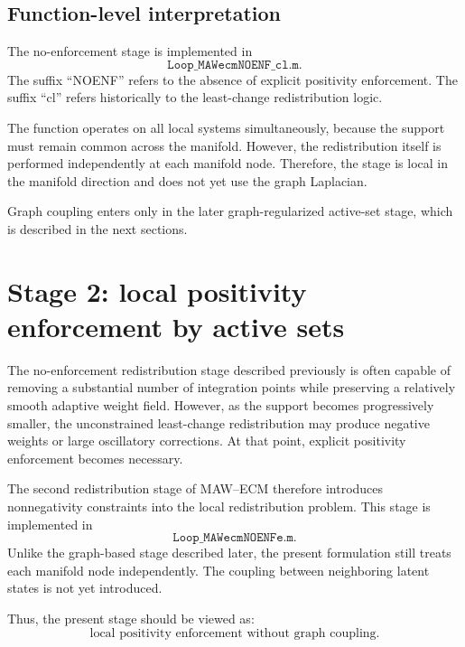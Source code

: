 \documentclass[11pt,a4paper]{article}
\begin{document}
\subsection{Function-level interpretation}

The no-enforcement stage is implemented in
\[
        \texttt{Loop\_MAWecmNOENF\_cl.m}.
\]
The suffix ``NOENF'' refers to the absence of explicit positivity enforcement.
The suffix ``cl'' refers historically to the least-change redistribution logic.

The function operates on all local systems simultaneously, because the support
must remain common across the manifold. However, the redistribution itself is
performed independently at each manifold node. Therefore, the stage is local in
the manifold direction and does not yet use the graph Laplacian.

Graph coupling enters only in the later graph-regularized active-set stage,
which is described in the next sections.


\section{Stage 2: local positivity enforcement by active sets}
\label{sec:local_active_set_stage}

The no-enforcement redistribution stage described previously is often capable
of removing a substantial number of integration points while preserving a
relatively smooth adaptive weight field. However, as the support becomes
progressively smaller, the unconstrained least-change redistribution may produce
negative weights or large oscillatory corrections. At that point, explicit
positivity enforcement becomes necessary.

The second redistribution stage of MAW--ECM therefore introduces nonnegativity
constraints into the local redistribution problem. This stage is implemented in
\[
        \texttt{Loop\_MAWecmNOENFe.m}.
\]
Unlike the graph-based stage described later, the present formulation still
treats each manifold node independently. The coupling between neighboring latent
states is not yet introduced.

Thus, the present stage should be viewed as:
\[
        \text{local positivity enforcement without graph coupling}.
\]
\end{document}
